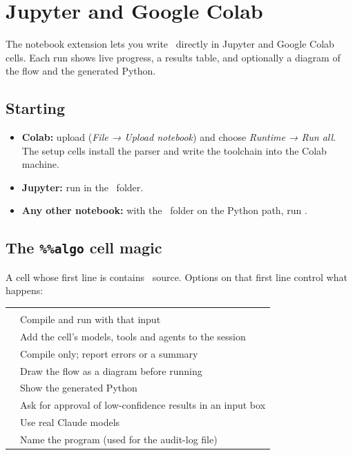 \chapter{Jupyter and Google Colab}
\label{ch:notebooks}

The notebook extension  lets you write \algolang\ directly in Jupyter and Google Colab cells. Each run shows live progress, a results table, and optionally a diagram of the flow and the generated Python.

\section{Starting}

\begin{itemize}
  \item \textbf{Colab:} upload  (\emph{File → Upload notebook}) and choose \emph{Runtime → Run all}. The setup cells install the parser and write the toolchain into the Colab machine.
  \item \textbf{Jupyter:} run  in the \algolang\ folder.
  \item \textbf{Any other notebook:} with the \algolang\ folder on the Python path, run .
\end{itemize}

\section{The \texttt{\%\%algo} cell magic}

A cell whose first line is  contains \algolang\ source. Options on that first line control what happens:

\begin{center}
\small
\begin{tabularx}{\linewidth}{@{}L{4.1cm}Y@{}}
\toprule
{} & \\
\goldrule
{} & Compile and run  with that input\\
 & Add the cell's models, tools and agents to the session\\
 & Compile only; report errors or a summary\\
 & Draw the flow as a diagram before running\\
 & Show the generated Python\\
 & Ask for approval of low-confidence results in an input box\\
 & Use real Claude models\\
 & Name the program (used for the audit-log file)\\
\bottomrule
\end{tabularx}
\end{center}

